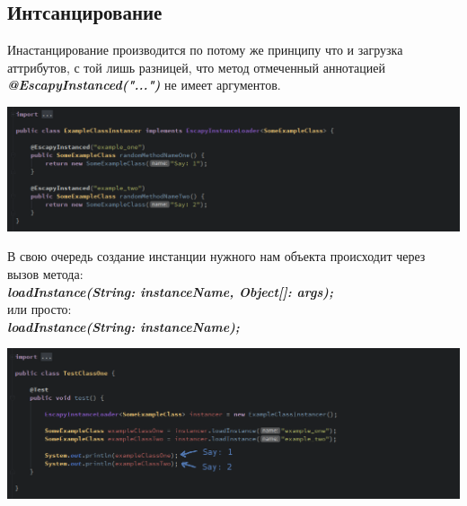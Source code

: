 \documentclass[11pt]{report}
\begin{document}
\subsection{Интсанцирование}
Инастанцирование производится по потому же принципу что и загрузка аттрибутов, с той лишь разницей, что метод отмеченный аннотацией \textit{\textbf{@EscapyInstanced("...")}}
не имеет аргументов. 
\begin{center}
	\includegraphics[width=1.2\linewidth]{img/14.png} 
  	\label{img:14} 
\end{center}
В свою очередь создание инстанции нужного нам объекта происходит через вызов метода:\\ \textit{\textbf{loadInstance(String: instanceName, Object[]: args);}} \\
или просто: \\  \textit{\textbf{loadInstance(String: instanceName);}} 
\begin{center}
	\includegraphics[width=1.2\linewidth]{img/15.png} 
  	\label{img:15} 
\end{center}
\end{document}
